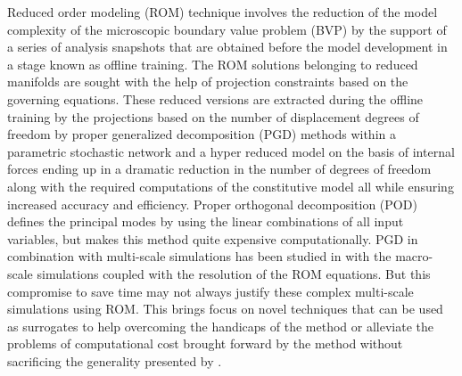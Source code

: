 Reduced order modeling (ROM) technique involves the reduction of the model complexity of the microscopic boundary value problem (BVP) by the support of a series of analysis snapshots that are obtained before the model development in a stage known as offline training. The ROM solutions belonging to reduced manifolds are sought with the help of projection constraints based on the governing equations. These reduced versions are extracted during the offline training by the projections based on the number of displacement degrees of freedom by proper generalized decomposition (PGD) methods within a parametric stochastic network\cite{chevreuilModelOrderReduction2012} and a hyper reduced model on the basis of internal forces\cite{hernandezDimensionalHyperreductionNonlinear2017} ending up in a dramatic reduction in the number of degrees of freedom along with the required computations of the constitutive model all while ensuring increased accuracy and efficiency. Proper orthogonal decomposition (POD)\cite{yvonnetReducedModelMultiscale2007} defines the principal modes by using the linear combinations of all input variables, but makes this method quite expensive computationally. PGD in combination with \fee multi-scale simulations has been studied in \cite{bhattacharjeeNonlinearManifoldbasedReduced2016} with the macro-scale simulations coupled with the resolution of the ROM equations. But this compromise to save time may not always justify these complex multi-scale simulations using ROM. This brings focus on novel techniques that can be used as surrogates to help overcoming the handicaps of the method or alleviate the problems of computational cost brought forward by the method without sacrificing the generality presented by \fee. 

